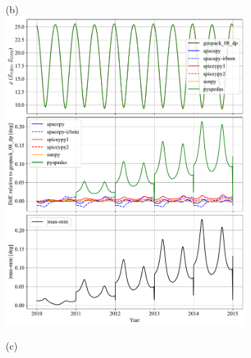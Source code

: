 \documentclass[draft]{agujournal2019}
\begin{document}
\begin{figure}[htb]
\begin{subfigure}[b]{0.49\textwidth}
     \end{subfigure}
     \begin{subfigure}[b]{0.49\textwidth}
         (b)
         \centering
         \includegraphics[width=\textwidth]{code/figures/angles/delta=1days_20100101-20150101/GEO_GSM.pdf}
     \end{subfigure}
     \par\bigskip\bigskip
     \begin{subfigure}[b]{0.49\textwidth}
         (c)
         \centering

\end{subfigure}
\end{figure}
\end{document}

